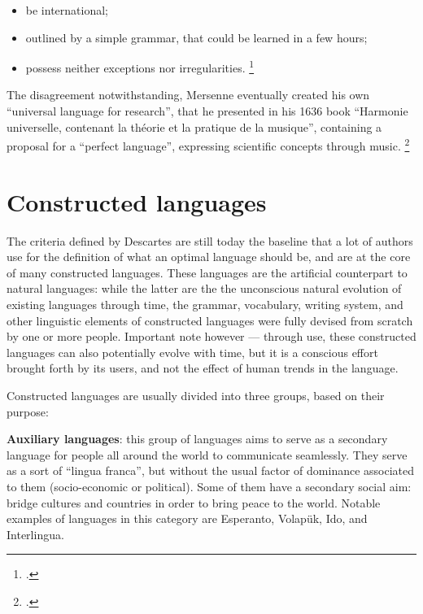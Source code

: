 \begin{itemize}
    \setlength\itemsep{-0.5em}
    \item be international;
    \item outlined by a simple grammar, that could be learned in a few hours;
    \item possess neither exceptions nor irregularities. \footcite[76-82]{descartes1897oeuvres}
\end{itemize}

The disagreement notwithstanding, Mersenne eventually created his own ``universal language for research'', that he presented in his 1636 book
``Harmonie universelle, contenant la th{\'e}orie et la pratique de la musique'', containing a proposal for a ``perfect language'', expressing scientific
concepts through music. \footcite[Book I, proposition 24]{mersenne1636}

\section{Constructed languages}

The criteria defined by Descartes are still today the baseline that a lot of authors use for the definition of what an optimal language should be, and are at the core of many
constructed languages. These languages are the artificial counterpart to natural languages: while the latter are the the unconscious natural evolution of existing languages through
time, the grammar, vocabulary, writing system, and other linguistic elements of constructed languages were fully devised from scratch by one or more people. Important note
however --- through use, these constructed languages can also potentially evolve with time, but it is a conscious effort brought forth by its users, and not the effect of human
trends in the language.\newline

Constructed languages are usually divided into three groups, based on their purpose:\newline

\textbf{Auxiliary languages}: this group of languages aims to serve as a secondary language for people all around the world to communicate seamlessly.
They serve as a sort of ``lingua franca'', but without the usual factor of dominance associated to them (socio-economic or political). Some of them have a secondary social aim:
bridge cultures and countries in order to bring peace to the world. Notable examples of languages in this category are Esperanto, Volapük, Ido, and Interlingua.

